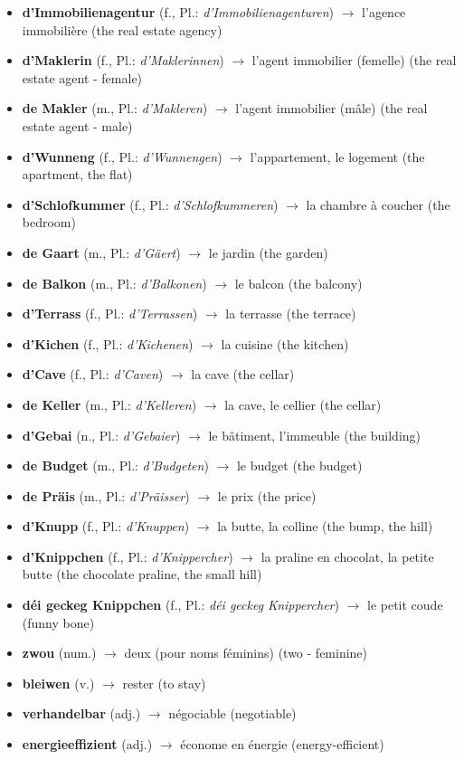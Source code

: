\begin{itemize}
    \item \textbf{d'Immobilienagentur} (f., Pl.: \textit{d'Immobilienagenturen}) $\rightarrow$ l'agence immobilière (the real estate agency)
    \item \textbf{d'Maklerin} (f., Pl.: \textit{d'Maklerinnen}) $\rightarrow$ l'agent immobilier (femelle) (the real estate agent - female)
    \item \textbf{de Makler} (m., Pl.: \textit{d'Makleren}) $\rightarrow$ l'agent immobilier (mâle) (the real estate agent - male)
    \item \textbf{d'Wunneng} (f., Pl.: \textit{d'Wunnengen}) $\rightarrow$ l'appartement, le logement (the apartment, the flat)
    \item \textbf{d'Schlofkummer} (f., Pl.: \textit{d'Schlofkummeren}) $\rightarrow$ la chambre à coucher (the bedroom)
    \item \textbf{de Gaart} (m., Pl.: \textit{d'Gäert}) $\rightarrow$ le jardin (the garden)
    \item \textbf{de Balkon} (m., Pl.: \textit{d'Balkonen}) $\rightarrow$ le balcon (the balcony)
    \item \textbf{d'Terrass} (f., Pl.: \textit{d'Terrassen}) $\rightarrow$ la terrasse (the terrace)
    \item \textbf{d'Kichen} (f., Pl.: \textit{d'Kichenen}) $\rightarrow$ la cuisine (the kitchen)
    \item \textbf{d'Cave} (f., Pl.: \textit{d'Caven}) $\rightarrow$ la cave (the cellar)
    \item \textbf{de Keller} (m., Pl.: \textit{d'Kelleren}) $\rightarrow$ la cave, le cellier (the cellar)
    \item \textbf{d'Gebai} (n., Pl.: \textit{d'Gebaier}) $\rightarrow$ le bâtiment, l'immeuble (the building)
    \item \textbf{de Budget} (m., Pl.: \textit{d'Budgeten}) $\rightarrow$ le budget (the budget)
    \item \textbf{de Präis} (m., Pl.: \textit{d'Präisser}) $\rightarrow$ le prix (the price)
    \item \textbf{d'Knupp} (f., Pl.: \textit{d'Knuppen}) $\rightarrow$ la butte, la colline (the bump, the hill)
    \item \textbf{d'Knippchen} (f., Pl.: \textit{d'Knippercher}) $\rightarrow$ la praline en chocolat, la petite butte (the chocolate praline, the small hill)
    \item \textbf{déi geckeg Knippchen} (f., Pl.: \textit{déi geckeg Knippercher}) $\rightarrow$ le petit coude (funny bone)
    \item \textbf{zwou} (num.) $\rightarrow$ deux (pour noms féminins) (two - feminine)
    \item \textbf{bleiwen} (v.) $\rightarrow$ rester (to stay)
    \item \textbf{verhandelbar} (adj.) $\rightarrow$ négociable (negotiable)
    \item \textbf{energieeffizient} (adj.) $\rightarrow$ économe en énergie (energy-efficient)
\end{itemize}

